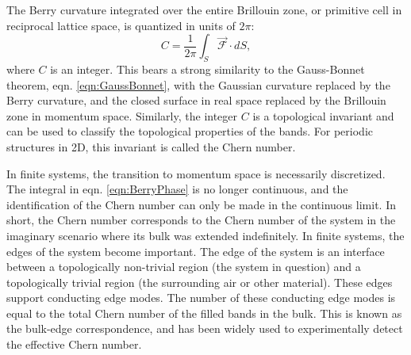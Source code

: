The Berry curvature integrated over the entire Brillouin zone, or primitive cell in reciprocal lattice space, is quantized in units of $2\pi$:
\begin{equation}
C=\frac{1}{2\pi} \int_S \vec{\mathcal{F}}\cdot dS,
\label{eqn:ChernFromBerryCurvature}
\end{equation}
where $C$ is an integer. This bears a strong similarity to the Gauss-Bonnet theorem, eqn. \ref{eqn:GaussBonnet}, with the Gaussian curvature replaced by the Berry curvature, and the closed surface in real space replaced by the Brillouin zone in momentum space. Similarly, the integer $C$ is a topological invariant and can be used to classify the topological properties of the bands. For periodic structures in 2D, this invariant is called the Chern number. 

In finite systems, the transition to momentum space is necessarily discretized. The integral in eqn. \ref{eqn:BerryPhase} is no longer continuous, and the identification of the Chern number can only be made in the continuous limit. In short, the Chern number corresponds to the Chern number of the system in the imaginary scenario where its bulk was extended indefinitely. In finite systems, the edges of the system become important. The edge of the system is an interface between a topologically non-trivial region (the system in question) and a topologically trivial region (the surrounding air or other material). These edges support conducting edge modes.  The number of these conducting edge modes is equal to the total Chern number of the filled bands in the bulk. This is known as the bulk-edge correspondence\cite{Thouless1982,Datta1995}, and has been widely used to experimentally detect the effective Chern number. 


